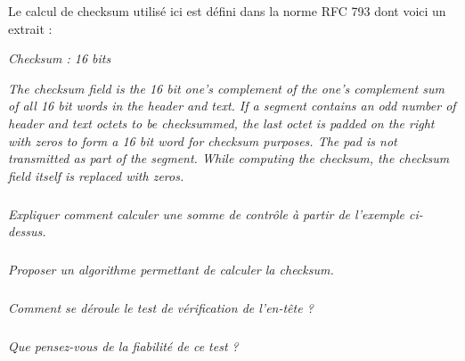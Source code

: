 \documentclass[10pt]{article}
\begin{document}
Le calcul de checksum utilisé ici est défini dans la norme RFC 793 dont voici un extrait : 
\begin{center}
\begin{minipage}[c]{.7\linewidth}
\textit{Checksum : 16 bits}

\noindent\textit{The checksum field is the 16 bit one's complement of the one's
complement sum of all 16 bit words in the header and text. If a
segment contains an odd number of header and text octets to be
checksummed, the last octet is padded on the right with zeros to
form a 16 bit word for checksum purposes. The pad is not
transmitted as part of the segment. While computing the checksum,
the checksum field itself is replaced with zeros.}
\end{minipage}
\end{center}


\subparagraph{}
\textit{Expliquer comment calculer une somme de contrôle à partir de l'exemple ci-dessus. }

\subparagraph{}
\textit{Proposer un algorithme permettant de calculer la checksum.}

\subparagraph{}
\textit{Comment se déroule le test de vérification de l'en-tête ?}

\subparagraph{}
\textit{Que pensez-vous de la fiabilité de ce test ?}
\end{document}
